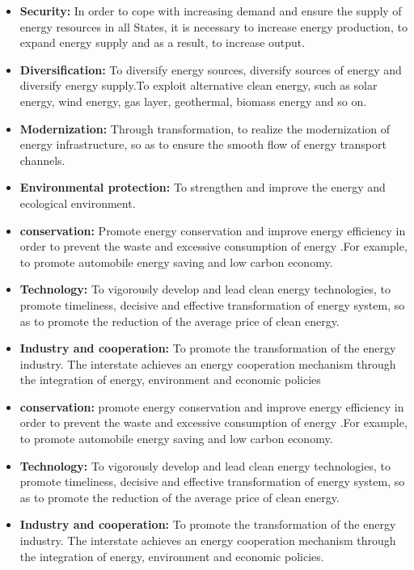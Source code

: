 \documentclass[a4paper]{article}
\begin{document}
\begin{itemize}

\item \textbf{Security:} In order to cope with increasing demand and ensure the supply of energy resources in all States, it is necessary to increase energy production, to expand energy supply and as a result, to increase output.

\item \textbf{Diversification:} To diversify energy sources, diversify sources of energy and diversify energy supply.To exploit alternative clean energy, such as solar energy, wind energy, gas layer, geothermal, biomass energy and so on.

\item \textbf{Modernization:} Through transformation, to realize the modernization of energy infrastructure, so as to ensure the smooth flow of energy transport channels.

\item \textbf{Environmental protection:} To strengthen and improve the energy and ecological environment.

\item \textbf{conservation:} Promote energy conservation and improve energy efficiency in order to prevent the waste and excessive consumption of energy .For example, to promote automobile energy saving and low carbon economy.

\item \textbf{Technology:} To vigorously develop and lead clean energy technologies, to promote timeliness, decisive and effective transformation of energy system, so as to promote the reduction of the average price of clean energy.

\item \textbf{Industry and cooperation:} To promote the transformation of the energy industry. The interstate achieves an energy cooperation mechanism through the integration of energy, environment and economic policies 

\item \textbf{conservation:} promote energy conservation and improve energy efficiency in order to prevent the waste and excessive consumption of energy .For example, to promote automobile energy saving and low carbon economy.

\item \textbf{Technology:} To vigorously develop and lead clean energy technologies, to promote timeliness, decisive and effective transformation of energy system, so as to promote the reduction of the average price of clean energy.

\item \textbf{Industry and cooperation:} To promote the transformation of the energy industry. The interstate achieves an energy cooperation mechanism through the integration of energy, environment and economic policies.

\end{itemize}
\end{document}
